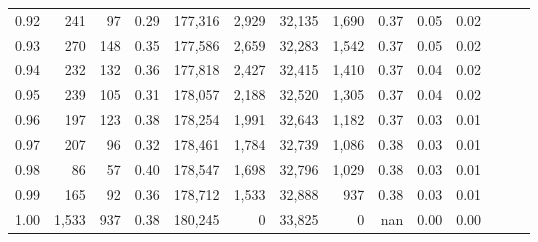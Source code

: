 \begin{tabular}{rrrrrrrrrrrrrr}
0.92 &    241 &   97 &  0.29 &  177,316 &    2,929 &  32,135 &   1,690 &  0.37 &  0.05 &      0.02 \\
0.93 &    270 &  148 &  0.35 &  177,586 &    2,659 &  32,283 &   1,542 &  0.37 &  0.05 &      0.02 \\
0.94 &    232 &  132 &  0.36 &  177,818 &    2,427 &  32,415 &   1,410 &  0.37 &  0.04 &      0.02 \\
0.95 &    239 &  105 &  0.31 &  178,057 &    2,188 &  32,520 &   1,305 &  0.37 &  0.04 &      0.02 \\
0.96 &    197 &  123 &  0.38 &  178,254 &    1,991 &  32,643 &   1,182 &  0.37 &  0.03 &      0.01 \\
0.97 &    207 &   96 &  0.32 &  178,461 &    1,784 &  32,739 &   1,086 &  0.38 &  0.03 &      0.01 \\
0.98 &     86 &   57 &  0.40 &  178,547 &    1,698 &  32,796 &   1,029 &  0.38 &  0.03 &      0.01 \\
0.99 &    165 &   92 &  0.36 &  178,712 &    1,533 &  32,888 &     937 &  0.38 &  0.03 &      0.01 \\
1.00 &  1,533 &  937 &  0.38 &  180,245 &        0 &  33,825 &       0 &   nan &  0.00 &      0.00 \\
\bottomrule
\end{tabular}
